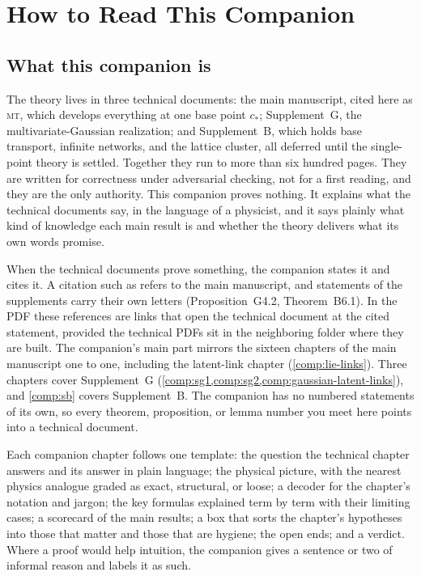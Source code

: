 \chapter*{How to Read This Companion}
\label{comp:guide}

\section*{What this companion is}

The theory lives in three technical documents: the main manuscript, cited here as \textsc{mt}, which
develops everything at one base point $c_*$; Supplement~G, the multivariate-Gaussian realization; and
Supplement~B, which holds base transport, infinite networks, and the lattice cluster, all deferred
until the single-point theory is settled. Together they run to more than six hundred pages. They are
written for correctness under adversarial checking, not for a first reading, and they are the only
authority. This companion proves nothing. It explains what the technical documents say, in the
language of a physicist, and it says plainly what kind of knowledge each main result is and whether
the theory delivers what its own words promise.

When the technical documents prove something, the companion states it and cites it. A citation such
as  refers to the main manuscript, and statements of the supplements carry
their own letters (Proposition~G4.2, Theorem~B6.1). In the PDF these references are links that open
the technical document at the cited statement, provided the technical PDFs sit in the neighboring
folder where they are built. The companion's main part mirrors the sixteen chapters of the main
manuscript one to one, including the latent-link chapter (\cref{comp:lie-links}). Three chapters cover
Supplement~G (\cref{comp:sg1,comp:sg2,comp:gaussian-latent-links}), and \cref{comp:sb} covers Supplement~B. The
companion has no numbered statements of its own, so every theorem, proposition, or lemma number you
meet here points into a technical document.

Each companion chapter follows one template: the question the technical chapter answers and its
answer in plain language; the physical picture, with the nearest physics analogue graded as exact,
structural, or loose; a decoder for the chapter's notation and jargon; the key formulas explained
term by term with their limiting cases; a scorecard of the main results; a box that sorts the
chapter's hypotheses into those that matter and those that are hygiene; the open ends; and a
verdict. Where a proof would help intuition, the companion gives a sentence or two of informal
reason and labels it as such.

